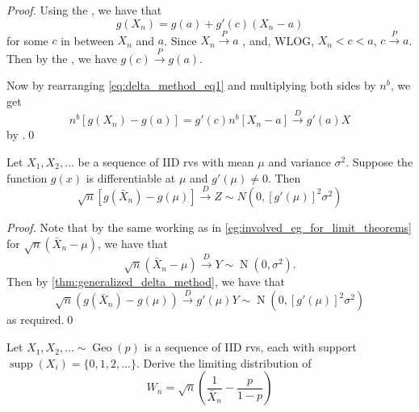 \documentclass[notoc,notitlepage]{tufte-book}
\DeclareMathOperator{\Geo}{Geo }
\DeclareMathOperator{\Nor}{N }
\DeclareMathOperator{\supp}{supp }
\newcommand{\convd}{\overset{D}{\to}}
\newcommand{\convp}{\overset{P}{\to}}
\begin{document}
\begin{proof}
  Using the , we have that
  \begin{equation}\label{eq:delta_method_eq1}
    g(X_n) = g(a) + g'(c) ( X_n - a )
  \end{equation}
  for some $c$ in between $X_n$ and $a$. Since $X_n \convp a$ , and, WLOG, $X_n < c < a$, $c \convp a$. Then by the , we have $g(c) \convp g(a)$.

  \noindent Now by rearranging \cref{eq:delta_method_eq1} and multiplying both sides by $n^b$, we get
  \begin{equation*}
    n^b [ g(X_n) - g(a) ] = g'(c) n^b [ X_n - a ] \convd g'(a) X
  \end{equation*}
  by .\qed
\end{proof}

\begin{crly}
\label{crly:_delta_method}
  Let $X_1, X_2, ...$ be a sequence of IID rvs with mean $\mu$ and variance $\sigma^2$. Suppose the function $g(x)$ is differentiable at $\mu$ and $g'(\mu) \neq 0$. Then
  \begin{equation*}
    \sqrt{n} [ g(\bar{X}_n) - g(\mu) ] \convd Z \sim N\left( 0, [ g'(\mu) ]^2 \sigma^2 \right)
  \end{equation*}
\end{crly}

\begin{proof}
  Note that by the same working as in \cref{eg:involved_eg_for_limit_theorems} for $\sqrt{n} ( \bar{X}_n - \mu )$, we have that
  \begin{equation*}
    \sqrt{n} ( \bar{X}_n - \mu ) \convd Y \sim \Nor(0, \sigma^2).
  \end{equation*}
  Then by \cref{thm:generalized_delta_method}, we have that
  \begin{equation*}
    \sqrt{n} ( g(\bar{X}_n) - g(\mu) ) \convd g'(\mu) Y \sim \Nor\left( 0, [g'(\mu)]^2 \sigma^2 \right)
  \end{equation*}
  as required.\qed
\end{proof}

\begin{eg}[Example 5.14]
  Let $X_1, X_2, ... \sim \Geo(p)$ is a sequence of IID rvs, each with support $\supp(X_i) = \{0, 1, 2, ...\}$. Derive the limiting distribution of
  \begin{equation*}
    W_n = \sqrt{n} \left( \frac{1}{\bar{X}_n} - \frac{p}{1 - p} \right)
  \end{equation*}
\end{eg}
\end{document}
